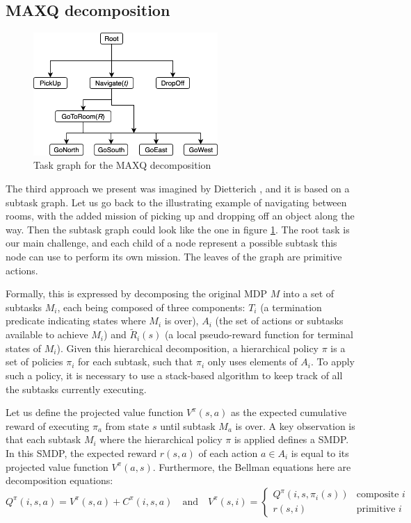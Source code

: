 \documentclass{article}
\begin{document}
\subsection{MAXQ decomposition}

\begin{figure}
\includegraphics[width=7cm]{images/MAXQ.png}
\caption{Task graph for the MAXQ decomposition}
\label{fig:MAXQ}
\end{figure}

The third approach we present was imagined by Dietterich \cite{dietterich_hierarchical_2000}, and it is based on a subtask graph. Let us go back to the illustrating example of navigating between rooms, with the added mission of picking up and dropping off an object along the way. Then the subtask graph could look like the one in figure \ref{fig:MAXQ}. The root task is our main challenge, and each child of a node represent a possible subtask this node can use to perform its own mission. The leaves of the graph are primitive actions.

Formally, this is expressed by decomposing the original MDP $M$ into a set of subtasks $M_i$, each being composed of three components: $T_i$ (a termination predicate indicating states where $M_i$ is over), 
$A_i$ (the set of actions or subtasks available to achieve $M_i$) and
$\tilde{R}_i(s)$ (a local pseudo-reward function for terminal states of $M_i$). Given this hierarchical decomposition, a hierarchical policy $\pi$ is a set of policies $\pi_i$ for each subtask, such that $\pi_i$ only uses elements of $A_i$. To apply such a policy, it is necessary to use a stack-based algorithm to keep track of all the subtasks currently executing.

Let us define the projected value function $V^{\pi}(s, a)$ as the expected cumulative reward of executing $\pi_a$ from state $s$ until subtask $M_a$ is over. A key observation is that each subtask $M_i$ where the hierarchical policy $\pi$ is applied defines a SMDP. In this SMDP, the expected reward $r(s, a)$ of each action $a \in A_i$ is equal to its projected value function $V^{\pi}(a, s)$. Furthermore, the Bellman equations here are decomposition equations:
\begin{equation}
    Q^{\pi}(i, s, a) = V^{\pi}(s, a) + C^{\pi}(i, s, a) \quad \text{and} \quad V^{\pi}(s, i) = \begin{cases} Q^{\pi}(i, s, \pi_i(s)) & \text{composite $i$} \\ r(s, i) & \text{primitive $i$} \end{cases}
\end{equation}
\end{document}
